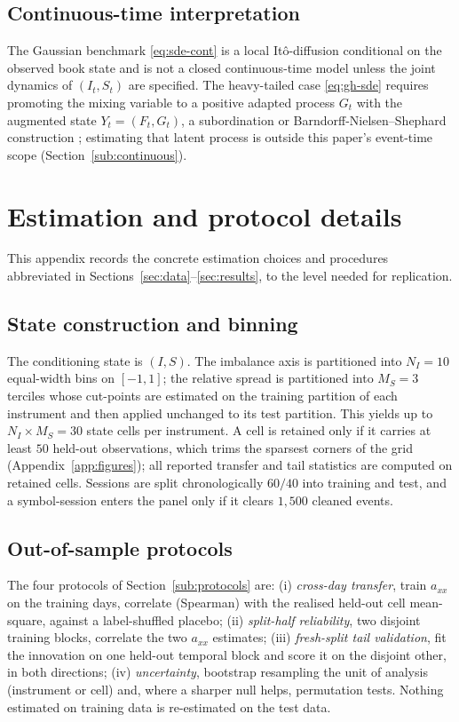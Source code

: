 \documentclass[11pt]{article}
\theoremstyle{plain}
\theoremstyle{definition}
\newcommand{\axx}{a_{xx}}
\begin{document}
\subsection{Continuous-time interpretation}
\label{app:continuous}
The Gaussian benchmark \eqref{eq:sde-cont} is a local It\^o-diffusion conditional on the
observed book state and is not a closed continuous-time model unless the joint dynamics of
$(I_t,S_t)$ are specified. The heavy-tailed case \eqref{eq:gh-sde} requires promoting the
mixing variable to a positive adapted process $G_t$ with the augmented state $Y_t=(F_t,G_t)$,
a subordination or Barndorff-Nielsen--Shephard construction \citep{barndorffnielsen1997};
estimating that latent process is outside this paper's event-time scope
(Section~\ref{sub:continuous}).

\section{Estimation and protocol details}
\label{app:estimation}
This appendix records the concrete estimation choices and procedures abbreviated in
Sections~\ref{sec:data}--\ref{sec:results}, to the level needed for replication.

\subsection{State construction and binning}
\label{app:binning}
The conditioning state is $(I,S)$. The imbalance axis is partitioned into
$N_I=10$ equal-width bins on $[-1,1]$; the relative spread is partitioned into
$M_S=3$ terciles whose cut-points are estimated on the training partition of each
instrument and then applied unchanged to its test partition. This yields up to
$N_I\times M_S=30$ state cells per instrument. A cell is retained only if it carries at
least $50$ held-out observations, which trims the sparsest corners of the grid
(Appendix~\ref{app:figures}); all reported transfer and tail statistics are computed on
retained cells. Sessions are split chronologically $60/40$ into training and test, and a
symbol-session enters the panel only if it clears $1{,}500$ cleaned events.

\subsection{Out-of-sample protocols}
\label{app:protocols-detail}
The four protocols of Section~\ref{sub:protocols} are: (i) \emph{cross-day transfer}, 
train $\axx$ on the training days, correlate (Spearman) with the realised held-out cell
mean-square, against a label-shuffled placebo; (ii) \emph{split-half reliability}, two
disjoint training blocks, correlate the two $\axx$ estimates; (iii) \emph{fresh-split tail
validation}, fit the innovation on one held-out temporal block and score it on the
disjoint other, in both directions; (iv) \emph{uncertainty}, bootstrap resampling the
unit of analysis (instrument or cell) and, where a sharper null helps, permutation tests.
Nothing estimated on training data is re-estimated on the test data.
\end{document}
